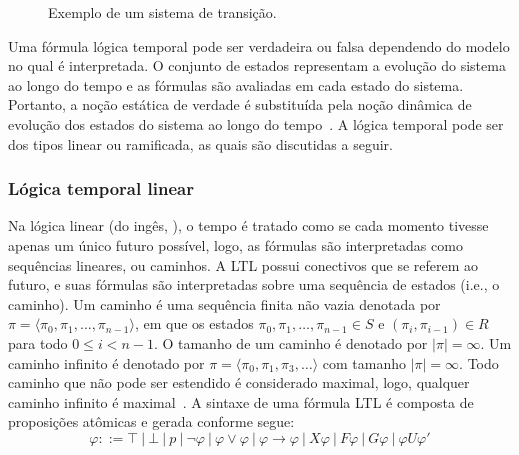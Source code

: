 \begin{figure}[ht]
\caption{Exemplo de um sistema de transição.}
\label{fig:temporal_grafo}
\centering
{}
\end{figure}

Uma fórmula lógica temporal pode ser verdadeira ou falsa dependendo do modelo no qual é interpretada. O conjunto de estados representam a evolução do sistema ao longo do tempo e as fórmulas são avaliadas em cada estado do sistema. Portanto, a noção estática de verdade é substituída pela noção dinâmica de evolução dos estados do sistema ao longo do tempo~\cite{clarke2018model}. A lógica temporal pode ser dos tipos linear ou ramificada, as quais são discutidas a seguir.

\subsubsection*{\textbf{Lógica temporal linear}}

Na lógica linear (do ingês, ), o tempo é tratado como se cada momento tivesse apenas um único futuro possível, logo, as fórmulas são interpretadas como sequências lineares, ou caminhos. A LTL possui conectivos que se referem ao futuro, e suas fórmulas são interpretadas sobre uma sequência de estados (i.e., o caminho). Um caminho é uma sequência finita não vazia denotada por $\pi = \langle \pi_{0}, \pi_{1}, \ldots, \pi_{n-1} \rangle$, em que os estados $\pi_{0}, \pi_{1}, \ldots, \pi_{n-1} \in S$ e $(\pi_{i}, \pi_{i-1}) \in R$ para todo $0 \leq i < n-1$. O tamanho de um caminho é denotado por $|\pi|=\infty$. Um caminho infinito é denotado por $\pi = \langle \pi_{0}, \pi_{1}, \pi_{3}, \ldots \rangle$ com tamanho $|\pi| = \infty$. Todo caminho que não pode ser estendido é considerado maximal, logo, qualquer caminho infinito é maximal~\cite{muller1999invited}. A sintaxe de uma fórmula LTL é composta de proposições atômicas e gerada conforme segue:
\begin{equation}
\varphi ::= \top~|~\bot~|~p~|~\neg \varphi~|~\varphi \vee \varphi~|~\varphi \rightarrow \varphi~|~X\varphi~|~F\varphi~|~G\varphi~|~\varphi U \varphi'
\end{equation}

